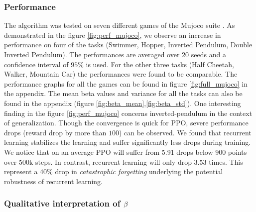 \subsubsection{Performance}
The algorithm was tested on seven different games of the Mujoco suite \cite{todorov2012mujoco}. As demonstrated in the figure \ref{fig:perf_mujoco}, we observe an increase in performance on four of the tasks (Swimmer, Hopper, Inverted Pendulum, Double Inverted Pendulum). The performances are averaged over 20 seeds and a confidence interval of $95\%$ is used. For the other three tasks (Half Cheetah, Walker, Mountain Car) the performances were found to be comparable. The performance graphs for all the games can be found in figure \ref{fig:full_mujoco} in the appendix. The mean beta values and variance for all the tasks can also be found in the appendix (figure \ref{fig:beta_mean},\ref{fig:beta_std}).
One interesting finding in the figure \ref{fig:perf_mujoco} concerns inverted-pendulum in the context of generalization. Though the convergence is quick for PPO, severe performance drops (reward drop by more than $100$) can be observed. We found that recurrent learning stabilizes the learning and suffer significantly less drops during training. We notice that on an average PPO will suffer from 5.91 drops below 900 points over 500k steps. In contrast, recurrent learning will only drop 3.53 times. This represent a 40\% drop in \emph{catastrophic forgetting} underlying the potential robustness of recurrent learning.

\subsubsection{Qualitative interpretation of $\beta$ }

